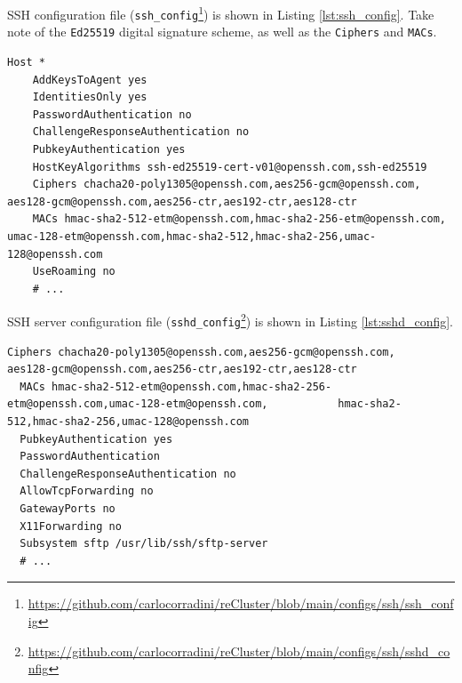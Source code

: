 SSH configuration file (\texttt{ssh\_config}\footnote{\url{https://github.com/carlocorradini/reCluster/blob/main/configs/ssh/ssh_config}})
is shown in Listing \ref{lst:ssh_config}. Take note of the \texttt{Ed25519} digital
signature scheme, as well as the \texttt{Ciphers} and \texttt{MACs}.

\begin{lstlisting}[language=shell, alsoletter={*.-@}, morekeywords={[4]{Host, AddKeysToAgent, IdentitiesOnly, PasswordAuthentication, ChallengeResponseAuthentication, PubkeyAuthentication, HostKeyAlgorithms, Ciphers, MACs, UseRoaming}}, keywordstyle={[5]\color{shellGreen}}, morekeywords={[5]{*, yes, no, ssh-ed25519-cert-v01@openssh.com, ssh-ed25519, chacha20-poly1305@openssh.com, aes256-gcm@openssh.com, aes128-gcm@openssh.com, aes256-ctr, aes192-ctr, aes128-ctr, hmac-sha2-512-etm@openssh.com, hmac-sha2-256-etm@openssh.com, umac-128-etm@openssh.com, hmac-sha2-512, hmac-sha2-256, umac-128@openssh.com}}, xleftmargin=\parindent, label={lst:ssh_config}, caption=SSH configuration file]
  Host *
    AddKeysToAgent yes
    IdentitiesOnly yes
    PasswordAuthentication no
    ChallengeResponseAuthentication no
    PubkeyAuthentication yes
    HostKeyAlgorithms ssh-ed25519-cert-v01@openssh.com,ssh-ed25519
    Ciphers chacha20-poly1305@openssh.com,aes256-gcm@openssh.com,                                           aes128-gcm@openssh.com,aes256-ctr,aes192-ctr,aes128-ctr
    MACs hmac-sha2-512-etm@openssh.com,hmac-sha2-256-etm@openssh.com,                                    umac-128-etm@openssh.com,hmac-sha2-512,hmac-sha2-256,umac-128@openssh.com
    UseRoaming no
    # ...
\end{lstlisting}

SSH server configuration file (\texttt{sshd\_config}\footnote{\url{https://github.com/carlocorradini/reCluster/blob/main/configs/ssh/sshd_config}})
is shown in Listing \ref{lst:sshd_config}.

\begin{lstlisting}[language=shell, xleftmargin=\parindent, alsoletter={*.-@/}, morekeywords={[4]{Ciphers, MACs, PubkeyAuthentication, PasswordAuthentication, ChallengeResponseAuthentication, AllowTcpForwarding, GatewayPorts, X11Forwarding, Subsystem}}, keywordstyle={[5]\color{shellGreen}}, morekeywords={[5]{no, yes, sftp, /usr/lib/ssh/sftp-server, chacha20-poly1305@openssh.com, aes256-gcm@openssh.com, aes128-gcm@openssh.com, aes256-ctr, aes192-ctr, aes128-ctr, hmac-sha2-512-etm@openssh.com, hmac-sha2-256-etm@openssh.com, umac-128-etm@openssh.com, hmac-sha2-512, hmac-sha2-256, umac-128@openssh.com}}, label={lst:sshd_config}, caption=SSH server configuration file]
  Ciphers chacha20-poly1305@openssh.com,aes256-gcm@openssh.com,                                           aes128-gcm@openssh.com,aes256-ctr,aes192-ctr,aes128-ctr
  MACs hmac-sha2-512-etm@openssh.com,hmac-sha2-256-etm@openssh.com,umac-128-etm@openssh.com,           hmac-sha2-512,hmac-sha2-256,umac-128@openssh.com
  PubkeyAuthentication yes
  PasswordAuthentication
  ChallengeResponseAuthentication no
  AllowTcpForwarding no
  GatewayPorts no
  X11Forwarding no
  Subsystem sftp /usr/lib/ssh/sftp-server
  # ...
\end{lstlisting}
